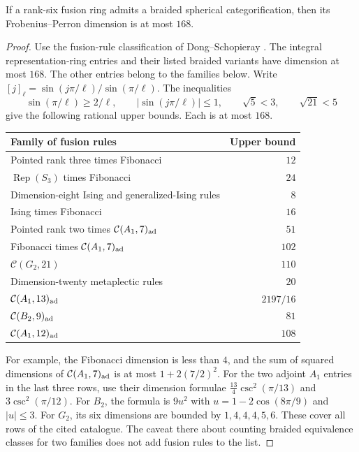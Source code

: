 \begin{proposition}\label{prop:rank6-premodular-dimension}
If a rank-six fusion ring admits a braided spherical categorification,
then its Frobenius--Perron dimension is at most $168$.
\end{proposition}
\begin{proof}
Use the fusion-rule classification of Dong--Schopieray
\cite[Section~5.3, Figures~13--15, 17 and 19]{DSNear}.
The integral representation-ring entries and their listed braided
variants have dimension at most $168$. The other entries belong to the
families below. Write $[j]_\ell=\sin(j\pi/\ell)/\sin(\pi/\ell)$.
The inequalities
\[
 \sin(\pi/\ell)\geq 2/\ell,\qquad
 |\sin(j\pi/\ell)|\leq1,\qquad
 \sqrt5<3,\qquad\sqrt{21}<5
\]
give the following rational upper bounds. Each is at most $168$.
\begin{center}
\begin{tabular}{lr}
\toprule
Family of fusion rules & Upper bound \\
\midrule
Pointed rank three times Fibonacci & $12$ \\
$\operatorname{Rep}(S_3)$ times Fibonacci & $24$ \\
Dimension-eight Ising and generalized-Ising rules & $8$ \\
Ising times Fibonacci & $16$ \\
Pointed rank two times $\mathcal C(A_1,7)_{\rm ad}$ & $51$ \\
Fibonacci times $\mathcal C(A_1,7)_{\rm ad}$ & $102$ \\
$\mathcal C(G_2,21)$ & $110$ \\
Dimension-twenty metaplectic rules & $20$ \\
$\mathcal C(A_1,13)_{\rm ad}$ & $2197/16$ \\
$\mathcal C(B_2,9)_{\rm ad}$ & $81$ \\
$\mathcal C(A_1,12)_{\rm ad}$ & $108$ \\
\bottomrule
\end{tabular}
\end{center}
For example, the Fibonacci dimension is less than $4$, and the sum of
squared dimensions of $\mathcal C(A_1,7)_{\rm ad}$ is at most
$1+2(7/2)^2$. For the two adjoint $A_1$ entries in the last three rows,
use their dimension formulae
$\tfrac{13}{4}\csc^2(\pi/13)$ and $3\csc^2(\pi/12)$.
For $B_2$, the formula is $9u^2$ with
$u=1-2\cos(8\pi/9)$ and $|u|\leq3$.
For $G_2$, its six dimensions are bounded by $1,4,4,4,5,6$.
These cover all rows of the cited catalogue. The caveat there about
counting braided equivalence classes for two families does not add
fusion rules to the list.
\end{proof}

